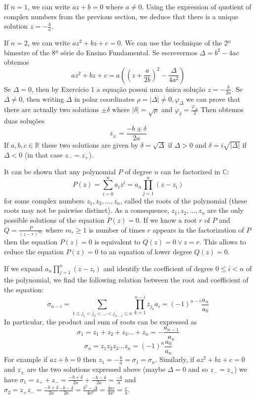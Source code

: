 If $n=1$, we can write $az+b = 0$ where $a\neq0$. Using the expression of
quotient of complex numbers from the previous section, we deduce that there is
a unique solution $z=-\frac{b}{a}$.

If $n=2$, we can write $a z^2 + b z + c = 0$. We can use the technique of the
2º bimestre of the 8ª série do Ensino Fundamental.
Se escrevermos $\Delta = b^2 - 4ac$ obtemos
$$a z^2 + b z + c =
a \left( \left(z + \frac{a}{2b}\right)^2 - \frac{\Delta}{4a^2} \right)$$
Se $\Delta = 0$, then by Exercício 1 a equação possui uma única solução
$z = -\frac{b}{2a}$.
Se $\Delta \neq 0$, then writing $\Delta$ in polar coordinates
$\rho={|\Delta|} \neq 0, \varphi_\Delta$ we can prove that there are actually two
solutions $\pm\delta$ where $|\delta| = \sqrt{\rho}$ and
$\varphi_\delta = \frac{\varphi_\Delta}{2}$
Then obtemos duas soluções
$$z_\pm = \frac{-b \pm \delta}{2a}$$
If $a,b,c \in \mathbb R$ these two solutions are given by
$\delta = \sqrt{\Delta}$ if $\Delta > 0$ and
$\delta = i \sqrt{|\Delta|}$ if $\Delta < 0$ (in that case $z_{-}=\overline{z_+}$).

It can be shown that any polynomial $P$ of degree $n$
can be factorized in $\mathbb C$:
$$
P(z) = {\sum_{i=0}^n a_i z^i} = a_n \prod_{j=1}^n \left(z-z_i\right)
$$
for some complex numbers $z_1, z_2, \dots, z_n$, called the roots of the
polynomial (these roots may not be pairwise distinct). As a consequence,
$z_1, z_2, \dots, z_n$ are the only possible solutions of the equation
$P(z) = 0$. If we know a root $r$ of $P$ and $Q = \frac{P}{{(z - r)}^{m_r}}$
where $m_r \geq 1$ is number of times $r$ appears in the factorization of $P$
then the equation $P(z) = 0$ is equivalent to $Q(z) = 0 \vee z = r$. This allows
to reduce the equation $P(z) = 0$ to an equation of lower degree $Q(z) = 0$.

If we expand $a_n \prod_{j=1}^n \left(z-z_i\right)$ and identify the coefficient
of degree $0 \leq i < n$ of the polynomial, we find the following relation
between the root and coefficient of the equation:
$$\sigma_{n-i} = \sum_{1 \leq j_1 < j_2 < \dots < j_{n-i} \leq n} \prod_{k=1}^{n-i} z_{j_k}a_i = {(-1)}^{n-i} \frac{a_n}{a_0} $$
In particular, the product and sum of roots can be expressed as
$$\sigma_1 = z_1+z_2+z_3\dots+z_n = -\frac{a_{n-1}}{a_n}$$
$$\sigma_n = z_1z_2z_3\dots z_n = {(-1)}^{n} \frac{a_0}{a_n}$$
For example if $az+b=0$ then $z_1 = -\frac{b}{a} = \sigma_1 = \sigma_n$.
Similarly, if $az^2+bz+c=0$ and $z_{\pm}$ are the
two solutions expressed above (maybe $\Delta = 0$ and so $z_- = z_+$) we have
$\sigma_1=z_+ + z_- = \frac{-b+\delta}{2a} + \frac{-b-\delta}{2a} = \frac{-b}{a}$ and
$\sigma_2=z_+ z_- = \frac{-b+\delta}{2a} \frac{-b-\delta}{2a} = \frac{b^2 - \Delta}{4a^2} = \frac{4ac}{4a^2} = \frac{c}{a}$.


